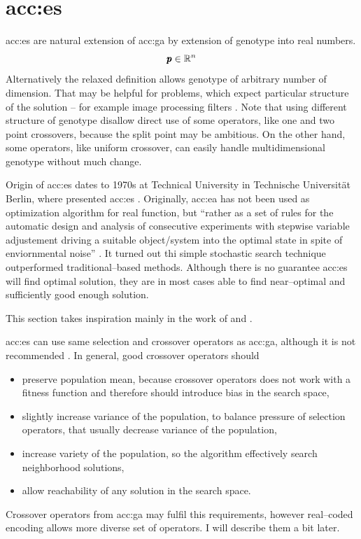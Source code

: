\section{\texorpdfstring{\acrlong*{acc:es}}{}}

\acrfull{acc:es} are natural extension of \acrshort{acc:ga} by extension of genotype into real numbers.
$$
\pmb{p} \in \mathbb{R}^{n}
$$
Alternatively the relaxed definition allows genotype of arbitrary number of dimension. That may be helpful for problems, which expect particular structure of the solution -- for example image processing filters \citep{WVDF}. Note that using different structure of genotype disallow direct use of some operators, like one and two point crossovers, because the split point may be ambitious. On the other hand, some operators, like uniform crossover, can easily handle multidimensional genotype without much change.

Origin of \acrlong{acc:es} dates to 1970s at Technical University in Technische Universität Berlin, where \citeauthor*{ES-original} presented \acrshort{acc:es} \citep{ES-original}. Originally, \acrshort{acc:ea} has not been used as optimization algorithm for real function, but \enquote{rather as a set of rules for the automatic design and analysis of consecutive experiments with stepwise variable adjustement driving a suitable object/system into the optimal state in spite of enviornmental noise} \citep{EScomprehensiveintroduction}. It turned out thi simple stochastic search technique outperformed traditional--based methods. Although there is no guarantee \acrshort{acc:es} will find optimal solution, they are in most cases able to find near--optimal and sufficiently good enough solution.

This section takes inspiration mainly in the work of \citet*{IntroductionToEA} and \citet*{EScomprehensiveintroduction}.

\acrshort{acc:es} can use same selection and crossover operators as \acrshort{acc:ga}, although it is not recommended \citet{IntroductionToEA}. In general, good crossover operators should
\begin{itemize}
    \item preserve population mean, because crossover operators does not work with a fitness function and therefore should introduce bias in the search space,
    \item slightly increase variance of the population, to balance pressure of selection operators, that usually decrease variance of the population,
    \item increase variety of the population, so the algorithm effectively search neighborhood solutions,
    \item allow reachability of any solution in the search space.
\end{itemize}
Crossover operators from \acrshort{acc:ga} may fulfil this requirements, however real--coded encoding allows more diverse set of operators. I will describe them a bit later.

